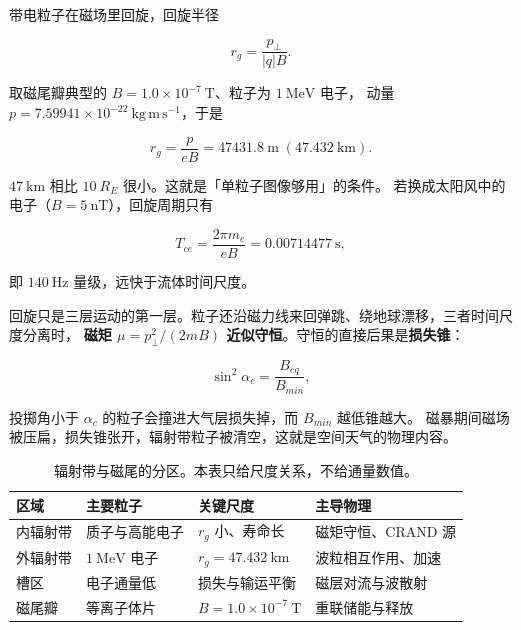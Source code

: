 带电粒子在磁场里回旋，回旋半径

\begin{equation}
r_g=\frac{p_\perp}{|q|B}.
\label{eq:app-ab-larmor}
\end{equation}

取磁尾瓣典型的 $B=1.0\times10^{-7}\ \mathrm{T}$、粒子为 $1\ \mathrm{MeV}$ 电子，
动量 $p=7.59941\times10^{-22}\ \mathrm{kg\,m\,s^{-1}}$，于是

\begin{equation}
r_g=\frac{p}{eB}=47431.8\ \mathrm{m}\;(47.432\ \mathrm{km}).
\label{eq:app-ab-rg}
\end{equation}

$47\ \mathrm{km}$ 相比 $10\ R_E$ 很小。这就是「单粒子图像够用」的条件。
若换成太阳风中的电子（$B=5\ \mathrm{nT}$），回旋周期只有

\begin{equation}
T_{ce}=\frac{2\pi m_e}{eB}=0.00714477\ \mathrm{s},
\label{eq:app-ab-tce}
\end{equation}

即 $140\ \mathrm{Hz}$ 量级，远快于流体时间尺度。

回旋只是三层运动的第一层。粒子还沿磁力线来回弹跳、绕地球漂移，三者时间尺度分离时，
\textbf{磁矩 $\mu=p_\perp^2/(2mB)$ 近似守恒}。守恒的直接后果是\textbf{损失锥}：

\begin{equation}
\sin^2\alpha_c=\frac{B_{eq}}{B_{min}},
\label{eq:app-ab-losscone}
\end{equation}

投掷角小于 $\alpha_c$ 的粒子会撞进大气层损失掉，而 $B_{min}$ 越低锥越大。
磁暴期间磁场被压扁，损失锥张开，辐射带粒子被清空，这就是空间天气的物理内容。

\begin{table}[htbp]
\centering
\small
\caption{辐射带与磁尾的分区。本表只给尺度关系，不给通量数值。}
\label{tab:app-ab-radbelt}
\begin{tabular}{p{2.6cm}p{3.2cm}p{3.2cm}p{4.2cm}}
\toprule
区域 & 主要粒子 & 关键尺度 & 主导物理 \\
\midrule
内辐射带 & 质子与高能电子 & $r_g$ 小、寿命长 & 磁矩守恒、CRAND 源 \\
外辐射带 & $1\ \mathrm{MeV}$ 电子 & $r_g=47.432\ \mathrm{km}$ & 波粒相互作用、加速 \\
槽区 & 电子通量低 & 损失与输运平衡 & 磁层对流与波散射 \\
磁尾瓣 & 等离子体片 & $B=1.0\times10^{-7}\ \mathrm{T}$ & 重联储能与释放 \\
\bottomrule
\end{tabular}

\end{table}

